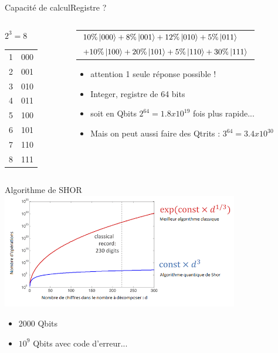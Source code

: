 \documentclass{beamer}
\begin{document}
\begin{frame}{Capacit\'e de calcul}{Registre ?}
  \begin{columns}
    \begin{column}{0.25\textwidth}
        $2^3 = 8$
      \begin{table}
        \begin{tabular}{ll}
          1 & 000\\
          2 & 001\\
          3 & 010\\
          4 & 011\\
          5 & 100\\
          6 & 101\\
          7 & 110\\
          8 & 111\\
        \end{tabular}
      \end{table}
    \end{column}
    \begin{column}{0.75\textwidth}
      \begin{table}
        \begin{tabular}{l}
          $10\%\ket{000}+8\%\ket{001}+12\%\ket{010}+5\%\ket{011}$\\
          $+10\%\ket{100}+20\%\ket{101}+5\%\ket{110}+30\%\ket{111}$\\
        \end{tabular}
      \end{table}
      \begin{itemize}
      \item attention 1 seule r\'eponse possible !
      \item Integer, registre de 64 bits 
      \item soit en Qbits $2^{64} = 1.8x10^{19}$ fois plus rapide...
      \item Mais on peut aussi faire des Qtrits : $3^{64} = 3.4x10^{30}$
      \end{itemize}
    \end{column}
  \end{columns}
\end{frame}

\begin{frame}{Algorithme de SHOR}{}
  \includegraphics[height=5cm]{shor.png}
  \begin{itemize}
  \item 2000 Qbits 
  \item $10^9$ Qbits avec code d'erreur...
  \end{itemize}
\end{frame}
\end{document}
